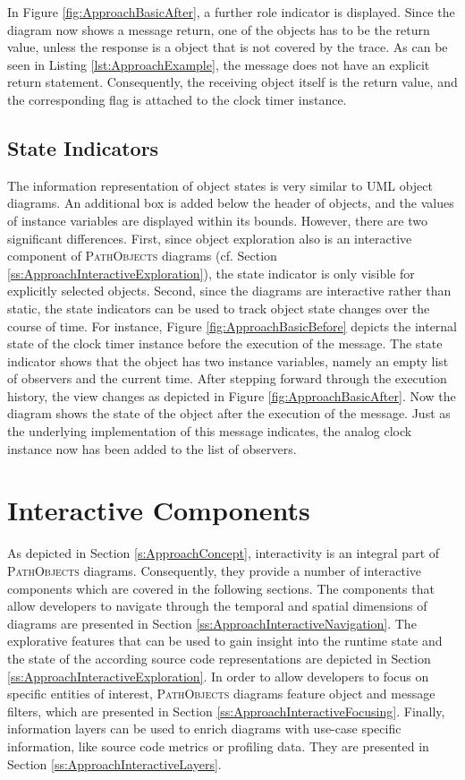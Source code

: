 In Figure \ref{fig:ApproachBasicAfter}, a further role indicator is displayed.
Since the diagram now shows a message return, one of the objects has to be the return value, unless the response is a object that is not covered by the trace.
As can be seen in Listing \ref{lst:ApproachExample}, the  message does not have an explicit return statement.
Consequently, the receiving object itself is the return value, and the corresponding flag is attached to the clock timer instance.

\subsection{State Indicators}
\label{ss:ApproachNotationState}
The information representation of object states is very similar to UML object diagrams.
An additional box is added below the header of objects, and the values of instance variables are displayed within its bounds.
However, there are two significant differences.
First, since object exploration also is an interactive component of \textsc{PathObjects} diagrams (cf. Section \ref{ss:ApproachInteractiveExploration}), the state indicator is only visible for explicitly selected objects.
Second, since the diagrams are interactive rather than static, the state indicators can be used to track object state changes over the course of time.
For instance, Figure \ref{fig:ApproachBasicBefore} depicts the internal state of the clock timer instance before the execution of the  message.
The state indicator shows that the object has two instance variables, namely an empty list of observers and the current time.
After stepping forward through the execution history, the view changes as depicted in Figure \ref{fig:ApproachBasicAfter}.
Now the diagram shows the state of the object after the execution of the  message.
Just as the underlying implementation of this message indicates, the analog clock instance now has been added to the list of observers.

\section{Interactive Components}
\label{s:ApproachInteractivity}
As depicted in Section \ref{s:ApproachConcept}, interactivity is an integral part of \textsc{PathObjects} diagrams.
Consequently, they provide a number of interactive components which are covered in the following sections.
The components that allow developers to navigate through the temporal and spatial dimensions of diagrams are presented in Section \ref{ss:ApproachInteractiveNavigation}.
The explorative features that can be used to gain insight into the runtime state and the state of the according source code representations are depicted in Section \ref{ss:ApproachInteractiveExploration}.
In order to allow developers to focus on specific entities of interest, \textsc{PathObjects} diagrams feature object and message filters, which are presented in Section \ref{ss:ApproachInteractiveFocusing}.
Finally, information layers can be used to enrich diagrams with use-case specific information, like source code metrics or profiling data.
They are presented in Section \ref{ss:ApproachInteractiveLayers}.

